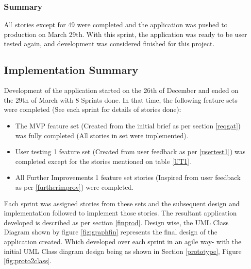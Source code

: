 \subsubsection{Summary}
All stories except for 49 were completed and the application was pushed to production on March 29th. With this sprint, the application was ready to be user tested again, and development was considered finished for this project.

\subsection{Implementation Summary}
Development of the application started on the 26th of December and ended on the 29th of March with 8 Sprints done. In that time, the following feature sets were completed (See each sprint for details of stories done):
\begin{itemize}
    \item The MVP feature set (Created from the initial brief as per section \ref{reqgat}) was fully completed (All stories in set were implemented).
    \item User testing 1 feature set (Created from user feedback as per \ref{usertest1}) was completed except for the stories mentioned on table \ref{UT1}.
    \item All Further Improvements 1 feature set stories (Inspired from user feedback as per \ref{furtherimprov}) were completed.
\end{itemize}
Each sprint was assigned stories from these sets and the subsequent design and implementation followed to implement those stories. The resultant application developed is described as per section \ref{finprod}. Design wise, the UML Class Diagram shown by figure \ref{fig:graphfin} represents the final design of the application created. Which developed over each sprint in an agile way- with the initial UML Class diagram design being as shown in Section \ref{prototype}, Figure \ref{fig:proto2class}.
